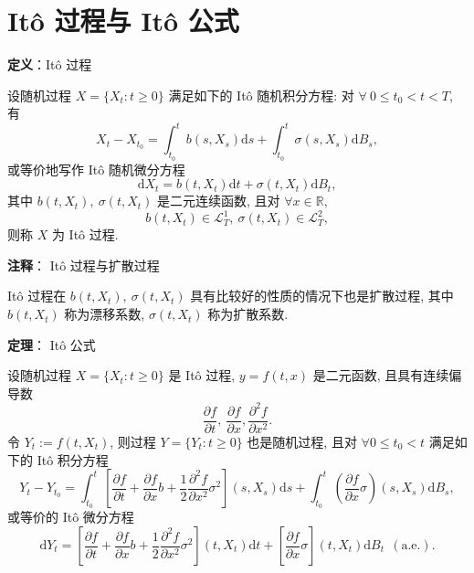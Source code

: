 \documentclass[openany]{ctexbook}
\theoremstyle{kaiti}
\theoremstyle{normal}
\begin{document}
\section{It\^o 过程与 It\^o 公式}

\textbf{定义}：It\^o 过程

设随机过程 $X=\{X_t:t\geqslant0\}$ 满足如下的 It\^o 随机积分方程: 对 $\forall~0\leqslant t_0<t<T$, 有
\begin{equation}
  X_t-X_{t_0}=\int_{t_0}^tb(s,X_s)\mathrm{d}s+\int_{t_0}^t\sigma(s,X_s)\mathrm{d}B_s,
\end{equation}
或等价地写作 It\^o 随机微分方程
\begin{equation}
  \mathrm{d}X_t=b(t,X_t)\mathrm{d}t+\sigma(t,X_t)\mathrm{d}B_t,
\end{equation}
其中 $b(t,X_t),~\sigma(t,X_t)$ 是二元连续函数, 且对 $\forall x\in\mathbb{R}$,
\begin{equation}
  b(t,X_t)\in\mathcal{L}_T^1,~ \sigma(t,X_t)\in\mathcal{L}_T^2,
\end{equation}
则称 $X$ 为 It\^o 过程.

\textbf{注释}： It\^o 过程与扩散过程

It\^o 过程在 $b(t,X_t),~\sigma(t,X_t)$ 具有比较好的性质的情况下也是扩散过程, 其中 $b(t,X_t)$ 称为漂移系数, $\sigma(t,X_t)$ 称为扩散系数.

\textbf{定理}： It\^o 公式

设随机过程 $X=\{X_t:t\geqslant0\}$ 是 It\^o 过程, $y=f(t,x)$ 是二元函数, 且具有连续偏导数
\begin{equation}
  \frac{\partial f}{\partial t},~\frac{\partial f}{\partial x},\frac{\partial^2 f}{\partial x^2}.
\end{equation}
令 $Y_t:= f(t,X_t)$, 则过程 $Y=\{Y_t:t\geqslant0\}$ 也是随机过程, 且对 $\forall0\leqslant t_0<t$ 满足如下的 It\^o 积分方程
\begin{equation}
  Y_t-Y_{t_0}=\int_{t_0}^t\left[\frac{\partial f}{\partial t}+\frac{\partial f}{\partial x}b+\frac{1}{2}\frac{\partial^2 f}{\partial x^2}\sigma^2\right](s,X_s)\mathrm{d}s+\int_{t_0}^t\left(\frac{\partial f}{\partial x}\sigma\right)(s,X_s)\mathrm{d}B_s,
\end{equation}
或等价的 It\^o 微分方程
\begin{equation}
  \mathrm{d}Y_t=\left[\frac{\partial f}{\partial t}+\frac{\partial f}{\partial x}b+\frac{1}{2}\frac{\partial^2 f}{\partial x^2}\sigma^2\right](t,X_t)\mathrm{d}t+\left[\frac{\partial f}{\partial x}\sigma\right](t,X_t)\mathrm{d}B_t~~(\text{a.e.}).
\end{equation}
\end{document}
